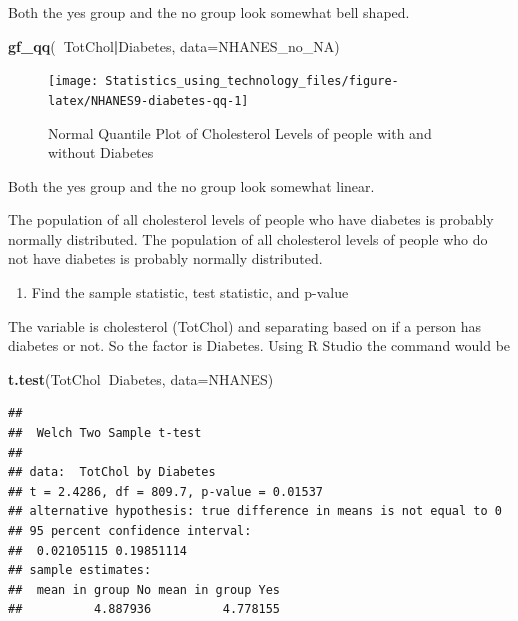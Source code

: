 \documentclass[
]{book}
\newenvironment{Shaded}{\begin{snugshade}}{\end{snugshade}}
\newcommand{\DataTypeTok}[1]{\textcolor[rgb]{0.13,0.29,0.53}{#1}}
\newcommand{\KeywordTok}[1]{\textcolor[rgb]{0.13,0.29,0.53}{\textbf{#1}}}
\newcommand{\NormalTok}[1]{#1}
\newcommand{\OperatorTok}[1]{\textcolor[rgb]{0.81,0.36,0.00}{\textbf{#1}}}
\providecommand{\tightlist}{%
  \setlength{\itemsep}{0pt}\setlength{\parskip}{0pt}}
\begin{document}
Both the yes group and the no group look somewhat bell shaped.



\begin{Shaded}
\begin{Highlighting}[]
\KeywordTok{gf_qq}\NormalTok{(}\OperatorTok{~}\NormalTok{TotChol}\OperatorTok{|}\NormalTok{Diabetes, }\DataTypeTok{data=}\NormalTok{NHANES_no_NA)}
\end{Highlighting}
\end{Shaded}

\begin{figure}
\texttt{[image: Statistics\_using\_technology\_files/figure-latex/NHANES9-diabetes-qq-1]} \caption{Normal Quantile Plot of Cholesterol Levels of people with and without Diabetes}\label{fig:NHANES9-diabetes-qq}
\end{figure}

Both the yes group and the no group look somewhat linear.

The population of all cholesterol levels of people who have diabetes is probably normally distributed. The population of all cholesterol levels of people who do not have diabetes is probably normally distributed.

\begin{enumerate}
\def\labelenumi{\arabic{enumi}.}
\setcounter{enumi}{3}
\tightlist
\item
  Find the sample statistic, test statistic, and p-value
\end{enumerate}

The variable is cholesterol (TotChol) and separating based on if a person has diabetes or not. So the factor is Diabetes. Using R Studio the command would be

\begin{Shaded}
\begin{Highlighting}[]
\KeywordTok{t.test}\NormalTok{(TotChol}\OperatorTok{~}\NormalTok{Diabetes, }\DataTypeTok{data=}\NormalTok{NHANES)}
\end{Highlighting}
\end{Shaded}

\begin{verbatim}
## 
##  Welch Two Sample t-test
## 
## data:  TotChol by Diabetes
## t = 2.4286, df = 809.7, p-value = 0.01537
## alternative hypothesis: true difference in means is not equal to 0
## 95 percent confidence interval:
##  0.02105115 0.19851114
## sample estimates:
##  mean in group No mean in group Yes 
##          4.887936          4.778155
\end{verbatim}
\end{document}

